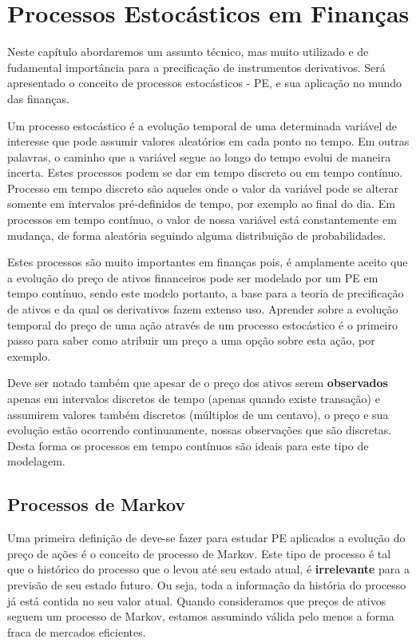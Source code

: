 \documentclass[]{book}
\theoremstyle{definition}
\theoremstyle{definition}
\theoremstyle{definition}
\theoremstyle{remark}
\begin{document}
\hypertarget{processos-estocasticos}{\chapter{Processos Estocásticos em
Finanças}\label{processos-estocasticos}}

Neste capítulo abordaremos um assunto técnico, mas muito utilizado e de
fudamental importância para a precificação de instrumentos derivativos.
Será apresentado o conceito de processos estocásticos - PE, e sua
aplicação no mundo das finanças.

Um processo estocástico é a evolução temporal de uma determinada
variável de interesse que pode assumir valores aleatórios em cada ponto
no tempo. Em outras palavras, o caminho que a variável segue ao longo do
tempo evolui de maneira incerta. Estes processos podem se dar em tempo
discreto ou em tempo contínuo. Processo em tempo discreto são aqueles
onde o valor da variável pode se alterar somente em intervalos
pré-definidos de tempo, por exemplo ao final do dia. Em processos em
tempo contínuo, o valor de nossa variável está constantemente em
mudança, de forma aleatória seguindo alguma distribuição de
probabilidades.

Estes processos são muito importantes em finanças pois, é amplamente
aceito que a evolução do preço de ativos financeiros pode ser modelado
por um PE em tempo contínuo, sendo este modelo portanto, a base para a
teoria de precificação de ativos e da qual os derivativos fazem extenso
uso. Aprender sobre a evolução temporal do preço de uma ação através de
um processo estocástico é o primeiro passo para saber como atribuir um
preço a uma opção sobre esta ação, por exemplo.

Deve ser notado também que apesar de o preço dos ativos serem
\textbf{observados} apenas em intervalos discretos de tempo (apenas
quando existe transação) e assumirem valores também discretos (múltiplos
de um centavo), o preço e sua evolução estão ocorrendo continuamente,
nossas observações que são discretas. Desta forma os processos em tempo
contínuos são ideais para este tipo de modelagem.

\section{Processos de Markov}\label{markov}

Uma primeira definição de deve-se fazer para estudar PE aplicados a
evolução do preço de ações é o conceito de processo de Markov. Este tipo
de processo é tal que o histórico do processo que o levou até seu estado
atual, é \textbf{irrelevante} para a previsão de seu estado futuro. Ou
seja, toda a informação da história do processo já está contida no seu
valor atual. Quando consideramos que preços de ativos seguem um processo
de Markov, estamos assumindo válida pelo menos a forma fraca de mercados
eficientes.
\end{document}
